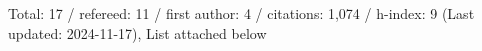 Total: 17 / refereed: 11 / first author: 4 / citations: 1,074 / h-index: 9 (Last updated: 2024-11-17), List attached below